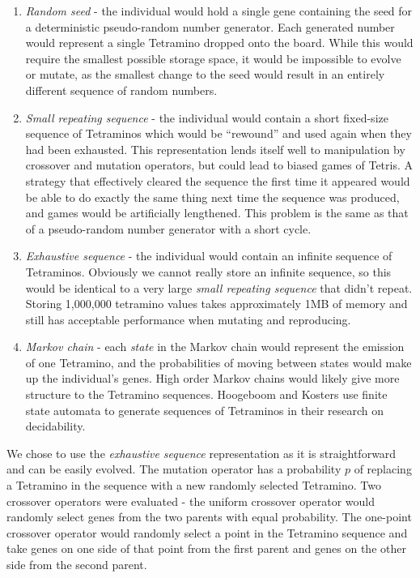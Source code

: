 \documentclass[a4paper,11pt]{article}
\begin{document}
\label{individualtype}
\begin{enumerate}
  \item \emph{Random seed} - the individual would hold a single gene containing
      the seed for a deterministic pseudo-random number generator.
      Each generated number would represent a single Tetramino dropped onto the
      board.
      While this would require the smallest possible storage space, it would be
      impossible to evolve or mutate, as the smallest change to the seed would
      result in an entirely different sequence of random numbers.
  \item \emph{Small repeating sequence} - the individual would contain a short
      fixed-size sequence of Tetraminos which would be ``rewound'' and used
      again when they had been exhausted.
      This representation lends itself well to manipulation by crossover and
      mutation operators, but could lead to biased games of Tetris.
      A strategy that effectively cleared the sequence the first time it
      appeared would be able to do exactly the same thing next time the
      sequence was produced, and games would be artificially lengthened.
      This problem is the same as that of a pseudo-random number generator with
      a short cycle.
  \item \emph{Exhaustive sequence} - the individual would contain an infinite
      sequence of Tetraminos.
      Obviously we cannot really store an infinite sequence, so this would be
      identical to a very large \emph{small repeating sequence} that didn't
      repeat.
      Storing 1,000,000 tetramino values takes approximately 1MB of memory and
      still has acceptable performance when mutating and reproducing.
  \item \emph{Markov chain} - each \emph{state} in the Markov chain would
      represent the emission of one Tetramino, and the probabilities of moving
      between states would make up the individual's genes.
      High order Markov chains would likely give more structure to the
      Tetramino sequences.
      Hoogeboom and Kosters \cite{hoogeboom2004tetris} use finite state
      automata to generate sequences of Tetraminos in their research on
      decidability.
\end{enumerate}

We chose to use the \emph{exhaustive sequence} representation as it is
straightforward and can be easily evolved.
The mutation operator has a probability $p$ of replacing a Tetramino in the
sequence with a new randomly selected Tetramino.
Two crossover operators were evaluated - the uniform crossover operator would
randomly select genes from the two parents with equal probability.
The one-point crossover operator would randomly select a point in the Tetramino
sequence and take genes on one side of that point from the first parent and
genes on the other side from the second parent.
\end{document}
